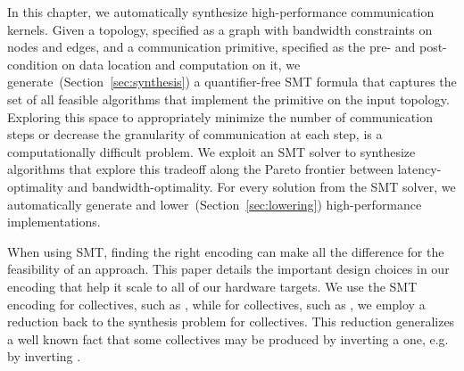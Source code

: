 In this chapter, we automatically synthesize high-performance
communication kernels. Given a topology, specified as a graph with
bandwidth constraints on nodes and edges, and a communication
primitive, specified as the pre- and post-condition on data location
and computation on it, we generate~(Section~\ref{sec:synthesis}) a
quantifier-free SMT formula that captures the set of all feasible
algorithms that implement the primitive on the input topology.
Exploring this space to appropriately minimize the number of
communication steps or decrease the granularity of communication at
each step, is a computationally difficult problem. We exploit an SMT
solver to synthesize algorithms that explore this tradeoff along the
Pareto frontier between latency-optimality and bandwidth-optimality.
For every solution from the SMT solver, we automatically generate and
lower~(Section~\ref{sec:lowering}) high-performance implementations.



When using SMT, finding the right encoding can make all the difference
for the feasibility of an approach. This paper details the important
design choices in our encoding that help it scale to all of our
hardware targets. We use the SMT encoding for \broadcasting
collectives, such as \broadcast, while for \reducing collectives, such
as \reduce, we employ a reduction back to the synthesis problem for
\broadcasting collectives.
This reduction generalizes a well known fact that some \reducing
collectives may be produced by inverting a \broadcasting one, e.g.
\reduce by inverting \broadcast.


